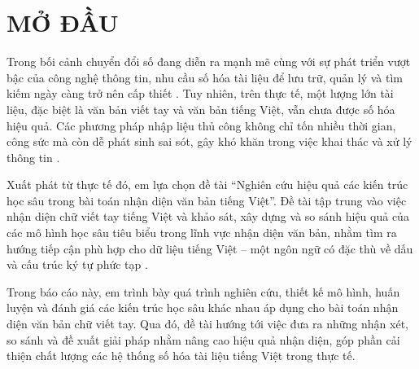 
\chapter*{MỞ ĐẦU} %

\label{Chapter0} %


Trong bối cảnh chuyển đổi số đang diễn ra mạnh mẽ cùng với sự phát triển vượt bậc của công nghệ thông tin, nhu cầu số hóa tài liệu để lưu trữ, quản lý và tìm kiếm ngày càng trở nên cấp thiết \cite{Reference1}. Tuy nhiên, trên thực tế, một lượng lớn tài liệu, đặc biệt là văn bản viết tay và văn bản tiếng Việt, vẫn chưa được số hóa hiệu quả. Các phương pháp nhập liệu thủ công không chỉ tốn nhiều thời gian, công sức mà còn dễ phát sinh sai sót, gây khó khăn trong việc khai thác và xử lý thông tin \cite{Reference2}.

Xuất phát từ thực tế đó, em lựa chọn đề tài “Nghiên cứu hiệu quả các kiến trúc học sâu trong bài toán nhận diện văn bản tiếng Việt”. Đề tài tập trung vào việc nhận diện chữ viết tay tiếng Việt và  khảo sát, xây dựng và so sánh hiệu quả của các mô hình học sâu tiêu biểu trong lĩnh vực nhận diện văn bản, nhằm tìm ra hướng tiếp cận phù hợp cho dữ liệu tiếng Việt – một ngôn ngữ có đặc thù về dấu và cấu trúc ký tự phức tạp \cite{Reference3}.

Trong báo cáo này, em trình bày quá trình nghiên cứu, thiết kế mô hình, huấn luyện và đánh giá các kiến trúc học sâu khác nhau áp dụng cho bài toán nhận diện văn bản chữ viết tay. Qua đó, đề tài hướng tới việc đưa ra những nhận xét, so sánh và đề xuất giải pháp nhằm nâng cao hiệu quả nhận diện, góp phần cải thiện chất lượng các hệ thống số hóa tài liệu tiếng Việt trong thực tế.

